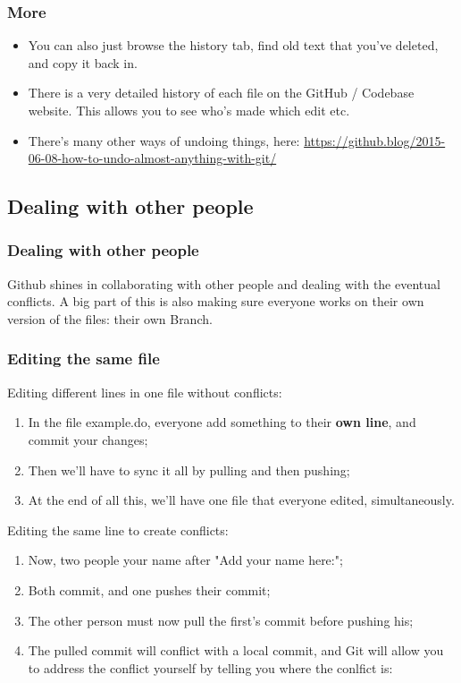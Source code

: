 \documentclass{beamer}
\begin{document}
\begin{frame}
	\frametitle{More}
	\begin{itemize}
		\item You can also just browse the history tab, find old text that you've deleted, and copy it back in.
		\item There is a very detailed history of each file on the GitHub / Codebase website. This allows you to see who's made which edit etc.
		\item There's many other ways of undoing things, here: \url{https://github.blog/2015-06-08-how-to-undo-almost-anything-with-git/}
	\end{itemize}
\end{frame}

\subsection{Dealing with other people}
\begin{frame}
\frametitle{Dealing with other people}
Github shines in collaborating with other people and dealing with the eventual conflicts. A big part of this is also making sure everyone works on their own version of the files: their own Branch.
\end{frame}

\begin{frame}
	\frametitle{Editing the same file}
	Editing different lines in one file without conflicts:
	\begin{enumerate}
		\item<2-> In the file example.do, everyone add something to their \textbf{own line}, and commit your changes;
		\item<2-> Then we'll have to sync it all by pulling and then pushing;
		\item<2-> At the end of all this, we'll have one file that everyone edited, simultaneously.
	\end{enumerate}
	Editing the same line to create conflicts:
	\begin{enumerate}
		\item<3-> Now, two people your name after "Add your name here:";
		\item<3-> Both commit, and one pushes their commit;
		\item<4-> The other person must now pull the first's commit before pushing his;
		\item<4-> The pulled commit will conflict with a local commit, and Git will allow you to address the conflict yourself by telling you where the conlfict is:
	\end{enumerate}
	
\end{frame}
\end{document}
